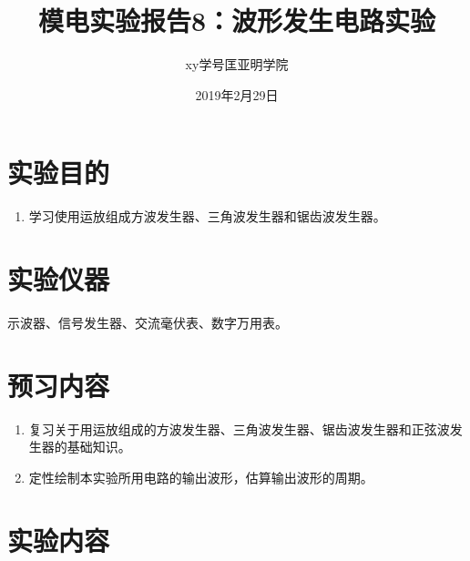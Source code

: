 \documentclass[a4paper]{article}
\title{模电实验报告8：波形发生电路实验}
\author{xy\quad 学号\quad 匡亚明学院}
\date{2019年2月29日}
\begin{document}
\maketitle


\section{实验目的}
\begin{enumerate}
\item 学习使用运放组成方波发生器、三角波发生器和锯齿波发生器。
\end{enumerate}

\section{实验仪器}
示波器、信号发生器、交流毫伏表、数字万用表。

\section{预习内容}
\begin{enumerate}
\item 复习关于用运放组成的方波发生器、三角波发生器、锯齿波发生器和正弦波发生器的基础知识。
\item 定性绘制本实验所用电路的输出波形，估算输出波形的周期。
\end{enumerate}

\section{实验内容}
\end{document}
